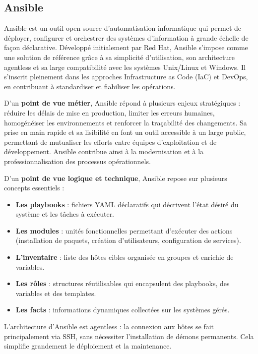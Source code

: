 \subsection{Ansible}

Ansible est un outil open source d’automatisation informatique qui permet de déployer, configurer et orchestrer des systèmes d’information à grande échelle de façon déclarative. Développé initialement par Red Hat, Ansible s’impose comme une solution de référence grâce à sa simplicité d’utilisation, son architecture agentless et sa large compatibilité avec les systèmes Unix/Linux et Windows. Il s’inscrit pleinement dans les approches Infrastructure as Code (IaC) et DevOps, en contribuant à standardiser et fiabiliser les opérations.

D’un \textbf{point de vue métier}, Ansible répond à plusieurs enjeux stratégiques  : réduire les délais de mise en production, limiter les erreurs humaines, homogénéiser les environnements et renforcer la traçabilité des changements. Sa prise en main rapide et sa lisibilité en font un outil accessible à un large public, permettant de mutualiser les efforts entre équipes d’exploitation et de développement. Ansible contribue ainsi à la modernisation et à la professionnalisation des processus opérationnels.

D’un \textbf{point de vue logique et technique}, Ansible repose sur plusieurs concepts essentiels  :
\begin{itemize}
	\item \textbf{Les playbooks}  : fichiers YAML déclaratifs qui décrivent l’état désiré du système et les tâches à exécuter.
	\item \textbf{Les modules}  : unités fonctionnelles permettant d’exécuter des actions (installation de paquets, création d’utilisateurs, configuration de services).
	\item \textbf{L’inventaire}  : liste des hôtes cibles organisée en groupes et enrichie de variables.
	\item \textbf{Les rôles}  : structures réutilisables qui encapsulent des playbooks, des variables et des templates.
	\item \textbf{Les facts}  : informations dynamiques collectées sur les systèmes gérés.
\end{itemize}

L’architecture d’Ansible est agentless  : la connexion aux hôtes se fait principalement via SSH, sans nécessiter l’installation de démons permanents. Cela simplifie grandement le déploiement et la maintenance.

